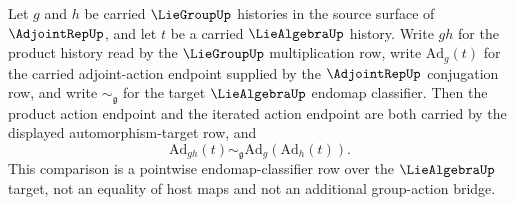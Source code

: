 \begin{theorem}
\label{thm:adjointrep-multiplicative-action-row}
Let $g$ and $h$ be carried $\LieGroupUp$ histories in the source surface of $\AdjointRepUp$, and let $t$ be a carried $\LieAlgebraUp$ history. Write $gh$ for the product history read by the $\LieGroupUp$ multiplication row, write $\mathrm{Ad}_{g}(t)$ for the carried adjoint-action endpoint supplied by the $\AdjointRepUp$ conjugation row, and write $\sim_{\mathfrak g}$ for the target $\LieAlgebraUp$ endomap classifier. Then the product action endpoint and the iterated action endpoint are both carried by the displayed automorphism-target row, and
$$
\mathrm{Ad}_{gh}(t)\sim_{\mathfrak g}\mathrm{Ad}_{g}(\mathrm{Ad}_{h}(t)).
$$
This comparison is a pointwise endomap-classifier row over the $\LieAlgebraUp$ target, not an equality of host maps and not an additional group-action bridge.
\end{theorem}
